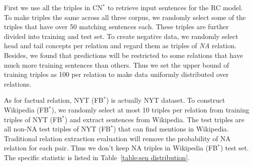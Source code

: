 \documentclass[11pt,a4paper]{article}
\newcommand{\KZ}[1]{\textcolor{blue}{Kenny: #1}}
\begin{document}
%
%

First we use all the triples in CN$^*$ to retrieve input sentences for the
RC model. To make triples the same across all three corpus, 
we randomly select some of the triples that have over 50 matching sentences each. 
These triples are further divided into training and test set. 
To create negative data, we randomly select head and tail concepts per relation and 
regard them as triples of \textit{NA} relation. Besides, we found that 
predictions will be restricted to some relations that have much more training sentences 
than others. Thus we set the upper bound of training triples as 100 per relation 
to make data uniformly distributed over relations. 

As for factual relation, NYT (FB$^*$) is actually NYT dataset. To construct Wikipedia (FB$^*$), we randomly select at most 10 triples per relation from training triples of NYT (FB$^*$) and extract sentences from Wikipedia. The test triples are all non-NA test triples of NYT (FB$^*$) that can find mentions in Wikipedia. Traditional relation extraction evaluation will remove the probability of NA relation for each pair. Thus we don't keep NA triples in Wikipedia (FB$^*$) test set.
The specific statistic is listed in Table~\ref{table:sen distribution}.
\end{document}
